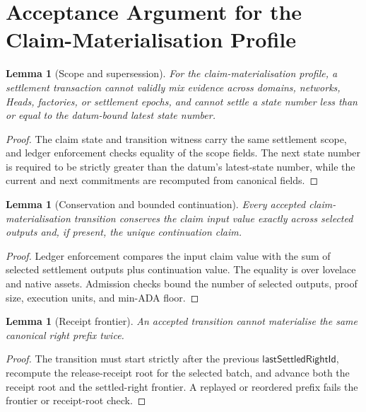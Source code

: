 \documentclass[a4paper,11pt]{article}
\theoremstyle{definition}
\theoremstyle{plain}
\newtheorem{lemma}[definition]{Lemma}
\theoremstyle{remark}
\begin{document}
\section{Acceptance Argument for the Claim-Materialisation Profile}
\label{sec:acceptance}

\begin{lemma}[Scope and supersession]
\label{lem:scope-supersession}
For the claim-materialisation profile, a settlement transaction cannot validly
mix evidence across domains, networks, Heads, factories, or settlement epochs,
and cannot settle a state number less than or equal to the datum-bound latest
state number.
\end{lemma}

\begin{proof}
The claim state and transition witness carry the same settlement scope, and
ledger enforcement checks equality of the scope fields. The next state number
is required to be strictly greater than the datum's latest-state number, while
the current and next commitments are recomputed from canonical fields.
\end{proof}

\begin{lemma}[Conservation and bounded continuation]
\label{lem:conservation-continuation}
Every accepted claim-materialisation transition conserves the claim input value
exactly across selected outputs and, if present, the unique continuation claim.
\end{lemma}

\begin{proof}
Ledger enforcement compares the input claim value with the sum of selected
settlement outputs plus continuation value. The equality is over lovelace and
native assets. Admission checks bound the number of selected outputs, proof
size, execution units, and min-ADA floor.
\end{proof}

\begin{lemma}[Receipt frontier]
\label{lem:receipt-frontier}
An accepted transition cannot materialise the same canonical right prefix
twice.
\end{lemma}

\begin{proof}
The transition must start strictly after the previous
\(\mathsf{lastSettledRightId}\), recompute the release-receipt root for the
selected batch, and advance both the receipt root and the settled-right
frontier. A replayed or reordered prefix fails the frontier or receipt-root
check.
\end{proof}
\end{document}
